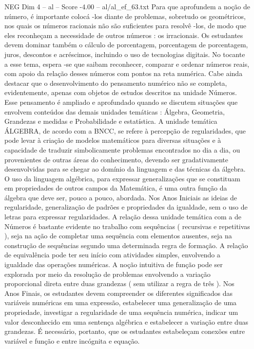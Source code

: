 \begin{textsample}{NEG Dim 4 – al – Score -4.00 – al/al\_ef\_63.txt}
Para que aprofundem a noção de número, é importante colocá -los diante de problemas, sobretudo os geométricos, nos quais os números racionais não são suficientes para resolvê -los, de modo que eles reconheçam a necessidade de outros números : os irracionais.
Os estudantes devem dominar também o cálculo de porcentagem, porcentagem de porcentagem, juros, descontos e acréscimos, incluindo o uso de tecnologias digitais.
No tocante a esse tema, espera -se que saibam reconhecer, comparar e ordenar números reais, com apoio da relação desses números com pontos na reta numérica.
Cabe ainda destacar que o desenvolvimento do pensamento numérico não se completa, evidentemente, apenas com objetos de estudos descritos na unidade Números.
Esse pensamento é ampliado e aprofundado quando se discutem situações que envolvem conteúdos das demais unidades temáticas : Álgebra, Geometria, Grandezas e medidas e Probabilidade e estatística.
A unidade temática ÁLGEBRA, de acordo com a BNCC, se refere à percepção de regularidades, que pode levar à criação de modelos matemáticos para diversas situações e à capacidade de traduzir simbolicamente problemas encontrados no dia a dia, ou provenientes de outras áreas do conhecimento, devendo ser gradativamente desenvolvidas para se chegar ao domínio da linguagem e das técnicas da álgebra.
O uso da linguagem algébrica, para expressar generalizações que se constituam em propriedades de outros campos da Matemática, é uma outra função da álgebra que deve ser, pouco a pouco, abordada.
Nos Anos Iniciais as ideias de regularidade, generalização de padrões e propriedades da igualdade, sem o uso de letras para expressar regularidades.
A relação dessa unidade temática com a de Números é bastante evidente no trabalho com sequências ( recursivas e repetitivas ), seja na ação de completar uma sequência com elementos ausentes, seja na construção de sequências segundo uma determinada regra de formação.
A relação de equivalência pode ter seu início com atividades simples, envolvendo a igualdade das operações numéricas.
A noção intuitiva de função pode ser explorada por meio da resolução de problemas envolvendo a variação proporcional direta entre duas grandezas ( sem utilizar a regra de três ).
Nos Anos Finais, os estudantes devem compreender os diferentes significados das variáveis numéricas em uma expressão, estabelecer uma generalização de uma propriedade, investigar a regularidade de uma sequência numérica, indicar um valor desconhecido em uma sentença algébrica e estabelecer a variação entre duas grandezas.
É necessário, portanto, que os estudantes estabeleçam conexões entre variável e função e entre incógnita e equação.

\end{textsample}
